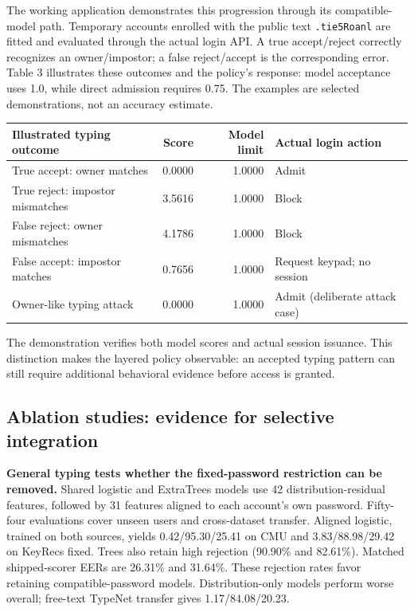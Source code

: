 \documentclass[10pt,a4paper]{article}
\begin{document}
The working application demonstrates this progression through its compatible-model path. Temporary accounts enrolled with the public text \texttt{.tie5Roanl} are fitted and evaluated through the actual login API. A true accept/reject correctly recognizes an owner/impostor; a false reject/accept is the corresponding error. Table 3 illustrates these outcomes and the policy's response: model acceptance uses 1.0, while direct admission requires 0.75. The examples are selected demonstrations, not an accuracy estimate.
\begin{center}\small
\begin{tabularx}{\linewidth}{@{}Xrrl@{}}
\toprule
\textbf{Illustrated typing outcome} & \textbf{Score} & \textbf{Model limit} & \textbf{Actual login action}\\\midrule
True accept: owner matches & 0.0000 & 1.0000 & Admit\\
True reject: impostor mismatches & 3.5616 & 1.0000 & Block\\
False reject: owner mismatches & 4.1786 & 1.0000 & Block\\
False accept: impostor matches & 0.7656 & 1.0000 & Request keypad; no session\\
Owner-like typing attack & 0.0000 & 1.0000 & Admit (deliberate attack case)\\\bottomrule
\end{tabularx}
\end{center}
The demonstration verifies both model scores and actual session issuance. This distinction makes the layered policy observable: an accepted typing pattern can still require additional behavioral evidence before access is granted.

\subsection{Ablation studies: evidence for selective integration}
\textbf{General typing tests whether the fixed-password restriction can be removed.} Shared logistic and ExtraTrees models use 42 distribution-residual features, followed by 31 features aligned to each account's own password. Fifty-four evaluations cover unseen users and cross-dataset transfer. Aligned logistic, trained on both sources, yields 0.42/95.30/25.41 on CMU and 3.83/88.98/29.42 on KeyRecs fixed. Trees also retain high rejection (90.90\% and 82.61\%). Matched shipped-scorer EERs are 26.31\% and 31.64\%. These rejection rates favor retaining compatible-password models. Distribution-only models perform worse overall; free-text TypeNet transfer gives 1.17/84.08/20.23.
\end{document}
